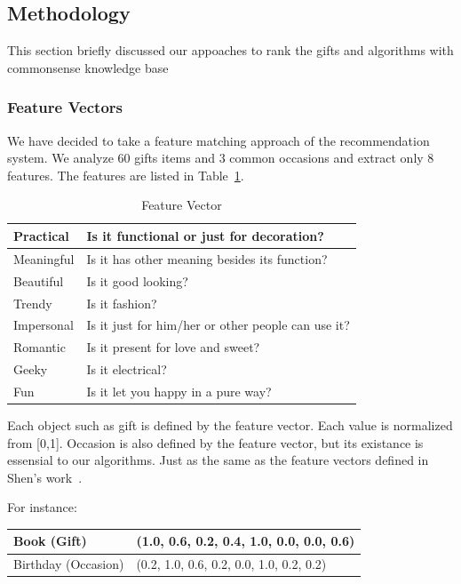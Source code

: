 \documentclass[11pt,twocolumn]{article}
\begin{document}
\subsection{Methodology}

This section briefly discussed our appoaches to rank the gifts and algorithms with commonsense knowledge base

\subsubsection{Feature Vectors}

We have decided to take a feature matching approach of the recommendation system.
We analyze 60 gifts items and 3 common occasions and extract only 8 features.  
The features are listed in Table~\ref{features}.


\begin{table}[ht]
\caption{Feature Vector}
\centering
\begin{tabular}{l l}
\hline
Practical & Is it functional or just for decoration? \\
\hline
Meaningful & Is it has other meaning besides its function? \\
\hline
Beautiful & Is it good looking? \\
\hline
Trendy & Is it fashion? \\
\hline
Impersonal & Is it just for him/her or other people can use it? \\
\hline
Romantic & Is it present for love and sweet? \\
\hline
Geeky & Is it electrical? \\
\hline
Fun & Is it let you happy in a pure way? \\
\end{tabular}
\label{features}
\end{table}


Each object such as gift is defined by the feature vector. Each value is normalized from [0,1].
Occasion is also defined by the feature vector, but its existance
is essensial to our algorithms. Just as the same as the feature vectors defined in Shen's work~\cite{Shen}.

\noindent For instance: 


\noindent \begin{tabular}{| l | l |}
\hline
Book (Gift) & (1.0, 0.6, 0.2, 0.4, 1.0, 0.0, 0.0, 0.6) \\
\hline
Birthday (Occasion) & (0.2, 1.0, 0.6, 0.2, 0.0, 1.0, 0.2, 0.2) \\
\hline
\end{tabular}
\end{document}
